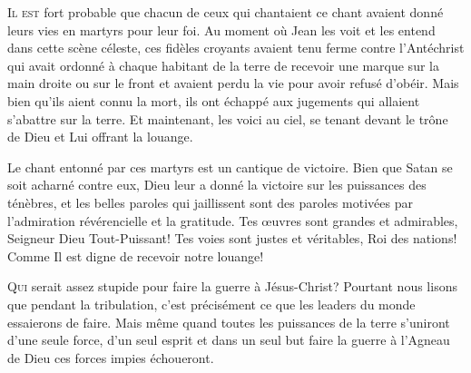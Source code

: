 
\lettrine{I}{l est} fort probable que chacun de ceux qui chantaient
 ce chant avaient donné leurs vies en martyrs pour leur foi.
 Au moment où Jean les voit et les entend dans cette scène céleste,
 ces fidèles croyants avaient tenu ferme contre l'Antéchrist
 \ocadr qui avait ordonné à chaque habitant de la terre de recevoir
 une marque sur la main droite ou sur le front \fcadr{}
 et avaient perdu la vie pour avoir refusé d'obéir.
 Mais bien qu'ils aient connu la mort, ils ont échappé aux jugements
 qui allaient s'abattre sur la terre. Et maintenant, les voici au ciel,
 se tenant devant le trône de Dieu et Lui offrant la louange.

Le chant entonné par ces martyrs est un cantique de victoire.
 Bien que Satan se soit acharné contre eux, Dieu leur a donné la victoire
 sur les puissances des ténèbres, et les belles paroles qui jaillissent
 sont des paroles motivées par l'admiration révérencielle et la gratitude.
 \Og Tes \oe{}uvres sont grandes et admirables, Seigneur Dieu Tout-Puissant!
 Tes voies sont justes et véritables, Roi des nations! \Fg{}
 Comme Il est digne de recevoir notre louange!


\dvrule






\lettrine{Q}{ui} serait assez stupide pour faire la guerre à Jésus-Christ?
 Pourtant nous lisons que pendant la tribulation,
 c'est précisément ce que les leaders du monde essaierons de faire.
 Mais même quand toutes les puissances de la terre s'uniront d'une seule force,
 d'un seul esprit et dans un seul but
 \ocadr faire la guerre à l'Agneau de Dieu \fcadr{}
 ces forces impies échoueront.

